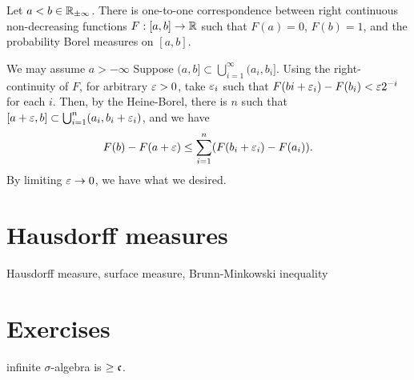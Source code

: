 \documentclass{../../large}
\begin{document}
\begin{prb}
\begin{parts}
\item Let $a<b\in\mathbb{R}_{\pm\infty}$. There is one-to-one correspondence between right continuous non-decreasing functions $F:[a,b]\to\mathbb{R}$ such that $F(a)=0$, $F(b)=1$, and the probability Borel measures on $[a,b]$.
\item 
\end{parts}
\end{prb}
\begin{pf}
We may assume $a>-\infty$
Suppose $(a,b]\subset\bigcup_{i=1}^\infty(a_i,b_i]$.
Using the right-continuity of $F$, for arbitrary $\varepsilon>0$, take $\varepsilon_i$ such that $F(bi+\varepsilon_i)-F(b_i)<\varepsilon2^{-i}$ for each $i$.
Then, by the Heine-Borel, there is $n$ such that $[a+\varepsilon,b]\subset\bigcup_{i=1}^n(a_i,b_i+\varepsilon_i)$, and we have
\[F(b)-F(a+\varepsilon)\le\sum_{i=1}^n(F(b_i+\varepsilon_i)-F(a_i)).\]
By limiting $\varepsilon\to0$, we have what we desired.

\end{pf}

\begin{prb}
\end{prb}

\begin{prb}
\end{prb}


\section{Hausdorff measures}

Hausdorff measure, surface measure, Brunn-Minkowski inequality

\section*{Exercises}

\begin{prb}[Cardinalities]
infinite $\sigma$-algebra is $\ge\mathfrak{c}$.

\end{prb}
\end{document}
